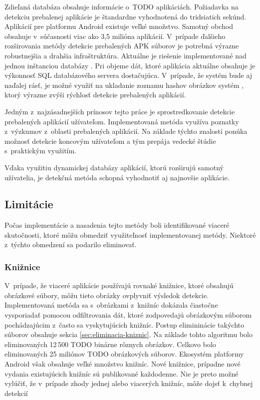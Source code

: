 Zdieľaná databáza obsahuje informácie o~TODO aplikáciách. Požiadavka na detekciu prebalenej aplikácie je štandardne vyhodnotená do tridsiatich sekúnd. Aplikácií pre platformu Android existuje veľké množstvo. Samotný obchod  obsahuje v~súčasnosti viac ako 3,5 milióna aplikácií. V~prípade ďalšieho rozširovania metódy detekcie prebalených APK súborov  je potrebná výrazne robustnejšia a drahšia infraštruktúra. Aktuálne je riešenie implementované nad jednou inštanciou databázy . Pri objeme dát, ktoré aplikácia aktuálne obsahuje je výkonnosť SQL databázového servera dostačujúca. V~prípade, že systém bude aj naďalej rásť, je možné využiť na ukladanie zoznamu hashov obrázkov systém , ktorý výrazne zvýši rýchlosť detekcie prebalených aplikácií. 

Jedným z~najzásadnejších prínosov tejto práce je sprostredkovanie detekcie prebalených aplikácií užívateľom. Implementovaná metóda využíva poznatky z~výzkumov z~oblasti prebalených aplikácií. Na základe týchto znalostí ponúka možnosť detekcie koncovým užívateľom a tým prepája vedecké štúdie s~praktickým využitím. 

Vďaka využitiu dynamickej databázy aplikácií, ktorú rozširujú samotný užívatelia, je detekčná metóda schopná vyhodnotiť aj najnovšie aplikácie.

\subsection{Limitácie}
Počas implementácie a nasadenia tejto metódy boli identifikované viaceré skutočnosti, ktoré môžu obmedziť využiteľnosť implementovanej metódy. Niektoré z~týchto obmedzení sa podarilo eliminovať.

\subsubsection{\textbf{Knižnice}}
V~prípade, že viaceré aplikácie používajú rovnaké knižnice, ktoré obsahujú obrázkové súbory, môžu tieto obrázky ovplyvniť výsledok detekcie. Implementovaná metóda sa s~obrázkami z~knižníc dokázala čiastočne vysporiadať pomocou odfiltrovania dát, ktoré zodpovedajú obrázkovým súborom pochádzajúcim z~často sa vyskytujúcich knižníc. Postup elimininácie takýchto súborov obsahuje sekcia \ref{sec:eliminacia-kniznic}. Na základe tohto algoritmu bolo eliminovaných 12\,500 TODO binárne rôznych obrázkov. Celkovo bolo eliminovaných 25 miliónov TODO obrázkových súborov. Ekosystém platformy Android však obsahuje veľké množstvo knižníc. Nové knižnice, prípadne nové vydania existujúcich knižníc sú publikované každodenne. Nie je preto možné vylúčiť, že v~prípade zhody jednej alebo viacerých knižníc, môže dojsť k~chybnej detekcií

